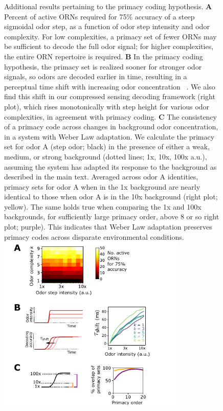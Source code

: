 \documentclass[9pt,lineno]{elife}
\begin{document}
\begin{figure}[tb]
{			Additional results pertaining to the primacy coding hypothesis. 
			\textbf{A} Percent of active ORNs required for 75\% accuracy of a steep sigmoidal odor step, as a function of odor step intensity and odor complexity. For low complexities, a primacy set of fewer ORNs may be sufficient to decode the full odor signal; for higher complexities, the entire ORN repertoire is required.
			\textbf{B} In the primacy coding hypothesis, the primacy set is realized sooner for stronger odor signals, so odors are decoded earlier in time, resulting in a perceptual time shift with increasing odor concentration ~\citep{primacy_coding}. We also find this shift in our compressed sensing decoding framework (right plot), which rises monotonically with step height for various odor complexities, in agreement with primacy coding.
			\textbf{C} The consistency of a primacy code across changes in background odor concentration, in a system with Weber Law adaptation. We calculate the primacy set for odor A (step odor; black) in the presence of either a weak, medium, or strong background (dotted lines; 1x, 10x, 100x a.u.), assuming the system has adapted its response to the background as described in the main text. Averaged across odor A identities, primacy sets for odor A when in the 1x background are nearly identical to those when odor A is in the 10x background (right plot; yellow). The same holds true when comparing the 1x and 100x backgrounds, for sufficiently large primacy order, above 8 or so right plot; purple). This indicates that Weber Law adaptation preserves primacy codes across disparate environmental conditions.}
			{\includegraphics[width=0.8\textwidth]{figure4_supp1}}\label{figsupp:SI_primacy}
\end{figure}
\end{document}
